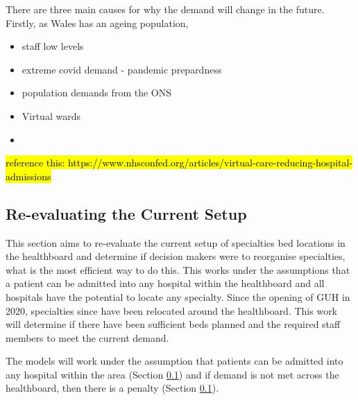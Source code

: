 \documentclass[../thesis.tex]{subfiles}
\begin{document}
There are three main causes for why the demand will change in the future. Firstly, as Wales has an ageing population, 

\begin{itemize}
    \item staff low levels
    \item extreme covid demand - pandemic prepardness
\end{itemize}

\begin{itemize}
    \item population demands from the ONS
    \item Virtual wards
    \item 
\end{itemize}
\hl{reference this: https://www.nhsconfed.org/articles/virtual-care-reducing-hospital-admissions}
\subsection{Re-evaluating the Current Setup}
This section aims to re-evaluate the current setup of specialties bed locations in the healthboard and determine if decision makers were to reorganise specialties, what is the most efficient way to do this. This works under the assumptions that a patient can be admitted into any hospital within the healthboard and all hospitals have the potential to locate any specialty. Since the opening of GUH in 2020, specialties since have been relocated around the healthboard. This work will determine if there have been sufficient beds planned and the required staff members to meet the current demand.

The models will work under the assumption that patients can be admitted into any hospital within the area (Section \ref{}) and if demand is not met across the healthboard, then there is a penalty (Section \ref{}).
\end{document}
